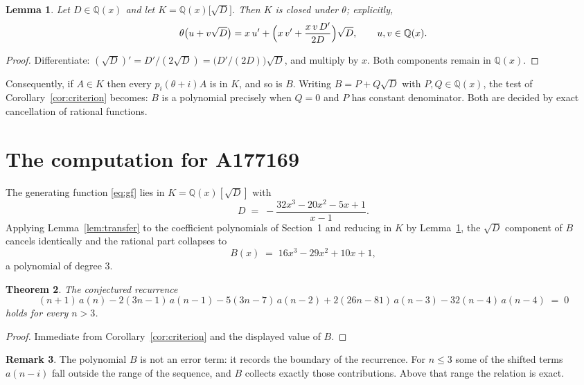 \documentclass[11pt,a4paper]{article}
\theoremstyle{plain}
\newtheorem{theorem}{Theorem}
\newtheorem{lemma}[theorem]{Lemma}
\theoremstyle{definition}
\newtheorem{remark}[theorem]{Remark}
\begin{document}
\begin{lemma}\label{lem:field}
Let $D\in\mathbb{Q}(x)$ and let $K=\mathbb{Q}(x)\bigl[\sqrt{D}\bigr]$. Then $K$ is closed
under $\theta$; explicitly,
\[
\theta\bigl(u+v\sqrt{D}\bigr)=x\,u'+\Bigl(x\,v'+\frac{x\,v\,D'}{2D}\Bigr)\sqrt{D},
\qquad u,v\in\mathbb{Q}(x).
\]
\end{lemma}

\begin{proof}
Differentiate: $(\sqrt{D})'=D'/(2\sqrt{D})=\bigl(D'/(2D)\bigr)\sqrt{D}$, and multiply by
$x$. Both components remain in $\mathbb{Q}(x)$.
\end{proof}

Consequently, if $A\in K$ then every $p_{i}(\theta+i)A$ is in $K$, and so is $B$. Writing
$B=P+Q\sqrt{D}$ with $P,Q\in\mathbb{Q}(x)$, the test of Corollary~\ref{cor:criterion}
becomes: $B$ is a polynomial precisely when $Q=0$ and $P$ has constant denominator. Both
are decided by exact cancellation of rational functions.

\section{The computation for A177169}

The generating function \eqref{eq:gf} lies in $K=\mathbb{Q}(x)[\sqrt{D}]$ with
\[
D \;=\; - \frac{32 x^{3} - 20 x^{2} - 5 x + 1}{x - 1} .
\]
Applying Lemma~\ref{lem:transfer} to the coefficient polynomials of Section~1 and reducing
in $K$ by Lemma~\ref{lem:field}, the $\sqrt{D}$ component of $B$ cancels identically and
the rational part collapses to
\[
B(x)\;=\;16 x^{3} - 29 x^{2} + 10 x + 1 ,
\]
a polynomial of degree $3$.

\begin{theorem}
The conjectured recurrence
\[
(n + 1)\,a(n) -  2 \left(3 n - 1\right)\,a(n-1) -  5 \left(3 n - 7\right)\,a(n-2) + 2 \left(26 n - 81\right)\,a(n-3) -  32 \left(n - 4\right)\,a(n-4) \;=\;0
\]
holds for every $n>3$.
\end{theorem}

\begin{proof}
Immediate from Corollary~\ref{cor:criterion} and the displayed value of $B$.
\end{proof}

\begin{remark}
The polynomial $B$ is not an error term: it records the boundary of the recurrence. For
$n\le3$ some of the shifted terms $a(n-i)$ fall outside the range of the sequence,
and $B$ collects exactly those contributions. Above that range the relation is exact.
\end{remark}
\end{document}
